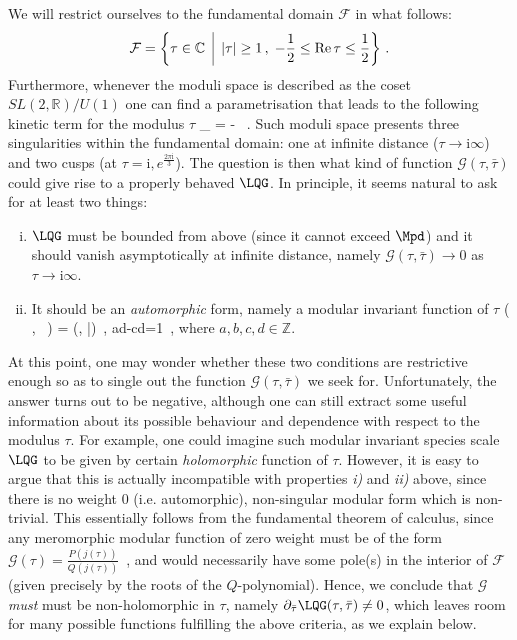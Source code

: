 We will restrict ourselves to the fundamental domain $\mathcal{F}$ in what follows:
%
\begin{align}\label{funddomain}
\mathcal{F} = \left\{\tau\in \mathbb{C} \;\;\vline \;\; |\tau|\geq 1 \, ,\; -\frac{1}{2} \leq \text{Re}\,\tau \leq \frac{1}{2}\right\}\, . 
\end{align}
%
Furthermore, whenever the moduli space is described as the coset $SL(2, \mathbb{R})/U(1)$ one can find a parametrisation that leads to the following kinetic term for the modulus $\tau$
%
\beq
{}_{} = - \ .
\label{eq:scalarlag}
\eeq
%
Such moduli space presents three singularities within the fundamental domain: one at infinite distance ($\tau \to \text{i} \infty$) and two cusps (at $\tau=\text{i}, e^{\frac{2\pi \text{i}}{3}}$). The question is then what kind of function $\mathcal{G}(\tau, \bar \tau)$ could give rise to a properly behaved $\LQG$. In principle, it seems natural to ask for at least two things: 

\begin{enumerate}[i)]
    \item $\LQG$ must be bounded from above (since it cannot exceed $\Mpd$) and it should vanish asymptotically at infinite distance, namely $\mathcal{G} (\tau, \bar \tau) \to 0$ as $\tau \to \text{i} \infty$.

    \item It should be an \emph{automorphic} form, namely a modular invariant function of $\tau$
%
\beq\label{eq:modtransf}
  \left(\, , \,  \right) =  (\tau, \bar \tau)\, , \qquad ad-cd=1\, ,
\eeq
%
where $a,b,c,d \in \mathbb{Z}$.
\end{enumerate}

At this point, one may wonder whether these two conditions are restrictive enough so as to single out the function $\mathcal{G}(\tau, \bar \tau)$ we seek for. Unfortunately, the answer turns out to be negative, although one can still extract some useful information about its possible behaviour and dependence with respect to the modulus $\tau$. For example, one could imagine such modular invariant species scale $\LQG$ to be given by certain \emph{holomorphic} function of $\tau$. However, it is easy to argue that this is actually incompatible with properties \emph{i)} and \emph{ii)} above, since there is no weight 0 (i.e. automorphic), non-singular modular form which is non-trivial. This essentially follows from the fundamental theorem of calculus, since any meromorphic modular function of zero weight must be of the form $ \mathcal{G} \left(\tau\right) = \frac{P(j(\tau))}{Q(j(\tau))}\, $ \cite{Cvetic:1991qm}, and would necessarily have some pole(s) in the interior of $\mathcal{F}$ (given precisely by the roots of the $Q$-polynomial). Hence, we conclude that $\mathcal{G}$ \emph{must} must be non-holomorphic in $\tau$, namely $\partial_{\bar \tau}\LQG(\tau, \bar \tau) \neq 0$, which leaves room for many possible functions fulfilling the above criteria, as we explain below.


